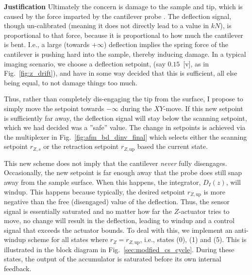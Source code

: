 \documentclass[twocolumn,twoside]{IEEEtran/IEEEtran}
\begin{document}
\textbf{Justification} Ultimately the concern is damage to the sample and tip,
which is caused by the force imparted by the cantilever probe
\cite{clayton_review_2009}. The deflection signal, though un-calibrated (meaning
it does not directly lead to a value in $kN$), is proportional to that force,
because it is proportional to how much the cantilever is bent. I.e., a large
(towards $+\infty$) deflection implies the spring force of the cantilever is
pushing hard into the sample, thereby inducing damage. In a typical imaging
scenario, we choose a deflection setpoint, (say $0.15$~[v], as in
Fig.~\ref{fig:z_drift}), and have in some way decided that this is sufficient,
all else being equal, to not damage things too much.

Thus, rather than completely dis-engaging the tip from the surface, I propose to
simply move the setpoint towards $-\infty$ during the $XY$-move. If this new
setpoint is sufficiently far away, the deflection signal will stay below the
scanning setpoint, which we had decided was a ''safe'' value. The change in
setpoints is achieved via the multiplexer in Fig.~\ref{fig:afm_bd_dinv_final}
which selects either the scanning setpoint $r_{Z,s}$ or the retraction setpoint
$r_{Z,\textrm{up}}$ based the current state.

%     
%     

This new scheme does not imply that the cantilever \emph{never} fully
disengages. Occasionally, the new setpoint is far enough away that the probe
does still snap away from the sample surface. When this happens, the integrator,
$D_I(z)$, will windup. This happens because typically, the desired setpoint
$r_{Z,\textrm{up}}$ is more negative than the free (disengaged) value of the
deflection. Thus, the sensor signal is essentially saturated and no matter how
far the $Z$-actuator tries to move, no change will result in the deflection,
leading to windup and a control signal that exceeds the actuator bounds. To deal
with this, we implement an anti-windup scheme for all states where
$r_Z=r_{Z,\textrm{up}}$, i.e., states (0), (1) and (5). This is illustrated in
the block diagram in Fig.~\ref{sec:modfied_cs_cycle}. During these states, the
output of the accumulator is saturated before its own internal feedback.
\end{document}
